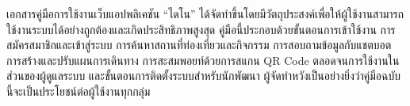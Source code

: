 
เอกสารคู่มือการใช้งานเว็บแอปพลิเคชัน ``ไดโน'' ได้จัดทำขึ้นโดยมีวัตถุประสงค์เพื่อให้ผู้ใช้งานสามารถใช้งานระบบได้อย่างถูกต้องและเกิดประสิทธิภาพสูงสุด คู่มือนี้ประกอบด้วยขั้นตอนการเข้าใช้งาน การสมัครสมาชิกและเข้าสู่ระบบ การค้นหาสถานที่ท่องเที่ยวและกิจกรรม การสอบถามข้อมูลกับแชตบอต การสร้างและปรับแผนการเดินทาง การสะสมพอยท์ด้วยการสแกน QR Code ตลอดจนการใช้งานในส่วนของผู้ดูแลระบบ และขั้นตอนการติดตั้งระบบสำหรับนักพัฒนา ผู้จัดทำหวังเป็นอย่างยิ่งว่าคู่มือฉบับนี้จะเป็นประโยชน์ต่อผู้ใช้งานทุกกลุ่ม

